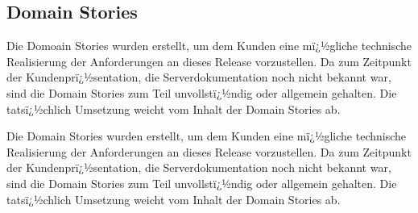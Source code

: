 \documentclass[12pt, titlepage]{scrartcl}
\begin{document}
	\subsection{Domain Stories}
		Die Domoain Stories wurden erstellt, um dem Kunden eine mï¿½gliche technische Realisierung der Anforderungen an dieses Release vorzustellen. Da zum Zeitpunkt der Kundenprï¿½sentation, die Serverdokumentation noch nicht bekannt war, sind die Domain Stories zum Teil unvollstï¿½ndig oder allgemein gehalten. Die tatsï¿½chlich Umsetzung weicht vom Inhalt der Domain Stories ab.
	
		Die Domain Stories wurden erstellt, um dem Kunden eine mï¿½gliche technische Realisierung der Anforderungen an dieses Release vorzustellen. Da zum Zeitpunkt der Kundenprï¿½sentation, die Serverdokumentation noch nicht bekannt war, sind die Domain Stories zum Teil unvollstï¿½ndig oder allgemein gehalten. Die tatsï¿½chlich Umsetzung weicht vom Inhalt der Domain Stories ab.
\end{document}
